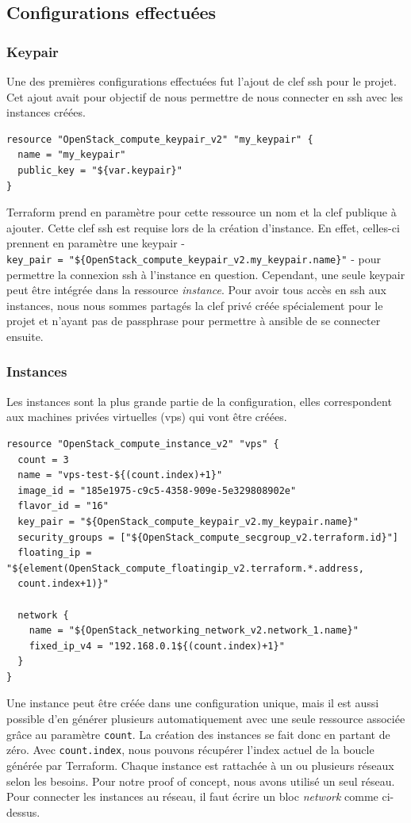 \documentclass[]{article}
\begin{document}
\subsection{Configurations
effectuées}\label{configurations-effectuuxe9es}

\subsubsection{Keypair}\label{keypair}

Une des premières configurations effectuées fut l'ajout de clef ssh pour
le projet. Cet ajout avait pour objectif de nous permettre de nous
connecter en ssh avec les instances créées.
\begin{verbatim}
resource "OpenStack_compute_keypair_v2" "my_keypair" {
  name = "my_keypair"
  public_key = "${var.keypair}"
}
\end{verbatim}
Terraform prend en paramètre pour cette ressource un nom et la clef
publique à ajouter. Cette clef ssh est requise lors de la création
d'instance. En effet, celles-ci prennent en paramètre une keypair -
\texttt{key\_pair\ =\ "\$\{OpenStack\_compute\_keypair\_v2.my\_keypair.name\}"}
- pour permettre la connexion ssh à l'instance en question. Cependant,
une seule keypair peut être intégrée dans la ressource \emph{instance}.
Pour avoir tous accès en ssh aux instances, nous nous sommes partagés la
clef privé créée spécialement pour le projet et n'ayant pas de
passphrase pour permettre à ansible de se connecter ensuite.

\subsubsection{Instances}\label{instances}

Les instances sont la plus grande partie de la configuration, elles
correspondent aux machines privées virtuelles (vps) qui vont être créées.
\begin{verbatim}
resource "OpenStack_compute_instance_v2" "vps" {
  count = 3
  name = "vps-test-${(count.index)+1}"
  image_id = "185e1975-c9c5-4358-909e-5e329808902e"
  flavor_id = "16"
  key_pair = "${OpenStack_compute_keypair_v2.my_keypair.name}"
  security_groups = ["${OpenStack_compute_secgroup_v2.terraform.id}"]
  floating_ip = "${element(OpenStack_compute_floatingip_v2.terraform.*.address,
  count.index+1)}"

  network {
    name = "${OpenStack_networking_network_v2.network_1.name}"
    fixed_ip_v4 = "192.168.0.1${(count.index)+1}"
  }
}
\end{verbatim}
Une instance peut être créée dans une configuration unique, mais il est aussi possible d'en générer plusieurs automatiquement avec une seule ressource associée grâce au paramètre \texttt{count}.
La création des instances se fait donc en partant de zéro. Avec \texttt{count.index}, nous pouvons récupérer l'index actuel de la boucle générée par Terraform. Chaque instance est rattachée à un ou plusieurs réseaux selon les besoins. Pour notre proof of concept, nous avons utilisé un seul réseau. Pour connecter les instances au réseau, il faut écrire un bloc \textit{network} comme ci-dessus.
\end{document}
